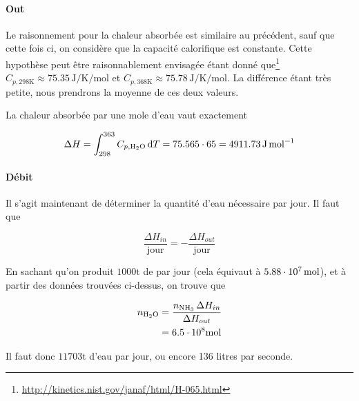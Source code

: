 \documentclass[a4paper, oneside, 12pt]{article}
\begin{document}
\paragraph{Out}

Le raisonnement pour la chaleur absorbée est similaire 
au précédent, sauf que cette fois ci, 
on considère que la capacité calorifique est constante.
Cette hypothèse peut être raisonnablement envisagée 
étant donné que\footnote{\url{http://kinetics.nist.gov/janaf/html/H-065.html}} 
$C_{p, 298 \si{\kelvin}} \approx 75.35 \, \si{\joule\per\kelvin\per\mole}$ 
et $C_{p, 368 \si{\kelvin}} \approx 75.78 \, \si{\joule\per\kelvin\per\mole}$.
La différence étant très petite, 
nous prendrons la moyenne de ces deux valeurs. 

La chaleur absorbée par une mole d'eau vaut exactement

\begin{equation}
	\Delta H = \int_{298}^{363} C_{p, \ce{H2O}} \, \dif{T}
	= 75.565 \cdot 65 = 4911.73 \, \si{\joule\per\mole}
\end{equation}

\paragraph{Débit}

Il s'agit maintenant de déterminer la quantité d'eau nécessaire par jour.
Il faut que

\[
	\frac{\Delta H_{in}}{\mathrm{jour}} 
	= - \frac{\Delta H_{out}}{\mathrm{jour}}
\]

En sachant qu'on produit $1000 \si{\tonne}$ de  par jour
(cela équivaut à $5.88\cdot 10^{7} \, \si{\mole}$),
et à partir des données trouvées ci-dessus, 
on trouve que

\begin{align*}
	n_{\ce{H2O}} &= \frac{n_{\ce{NH3}} \, \Delta H_{in}}{\Delta H_{out}} \\
	&= 6.5\e{8} \si{\mole} 
\end{align*}

Il faut donc $11703 \si{\tonne}$ d'eau par jour, 
ou encore 136 litres par seconde.
\end{document}
